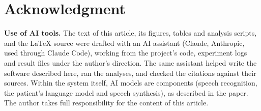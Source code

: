 \documentclass[journal]{IEEEtran}
\begin{document}
\section*{Acknowledgment}
\textbf{Use of AI tools.} The text of this article, its figures, tables and analysis scripts, and the \LaTeX{} source were
drafted with an AI assistant (Claude, Anthropic, used through Claude Code), working from the project's code, experiment logs and result
files under the author's direction. The same assistant helped write the software described here, ran the analyses, and checked the
citations against their sources. Within the system itself, AI models are components (speech recognition, the patient's language model and speech synthesis), as described in the paper. The author takes full responsibility for the content of this article.



\end{document}
